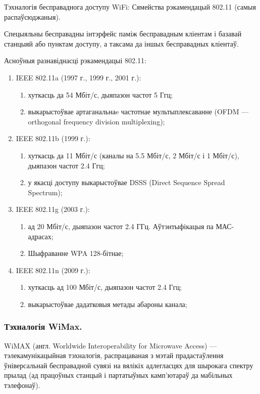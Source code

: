 Тэхналогія бесправаднога доступу WiFi: Сямейства рэкамендацый 802.11 (самыя распаўсюджаныя).

Спецыяльны бесправадны інтэрфейс паміж бесправадным кліентам і базавай станцыяй або пунктам доступу, а таксама да іншых бесправадных кліентаў.

Асноўныя разнавіднасці рэкамендацыі 802.11:
\begin{enumerate}
    \item IEEE 802.11a (1997 г., 1999 г., 2001 г.):
    \begin{enumerate}
        \item хуткасць да 54 Мбіт/с, дыяпазон частот 5 Ггц;
        \item выкарыстоўвае  артаганальнаe частотнае мультыплексаванне (OFDM --- or\-tho\-go\-nal frequency division multiplexing);
    \end{enumerate}
    \item IEEE 802.11b (1999 г.):
    \begin{enumerate}
        \item хуткасць да 11 Мбіт/с (каналы на 5.5 Мбіт/с, 2 Мбіт/с і 1 Мбіт/с), дыяпазон частот 2.4 Ггц;
        \item у якасці доступу выкарыстоўвае DSSS (Direct Sequence Spread Spectrum);
    \end{enumerate}
    \item IEEE 802.11g (2003 г.):
    \begin{enumerate}
        \item ад 20 Мбіт/с, дыяпазон частот 2.4 ГГц. Аўтэнтыфікацыя па МАС-адрасах;
        \item Шыфраванне WPA 128-бітнае;
    \end{enumerate}
    \item IEEE 802.11n (2009 г.):
    \begin{enumerate}
        \item хуткасць ад 100 Мбіт/с, дыяпазон частот 2.4 Ггц;
        \item выкарыстоўвае дадатковыя метады абароны канала;
    \end{enumerate}
\end{enumerate}

\subsubsection{Тэхналогія WiMax.}

WiMAX (англ. Worldwide Interoperability for Microwave Access) --- тэлекамунікацыйная тэхналогія, распрацаваная з мэтай прадастаўлення ўніверсальнай бесправадной сувязі на вялікіх адлегласцях для шырокага спектру прылад (ад працоўных станцый і партатыўных камп'ютараў да мабільных тэлефонаў).

